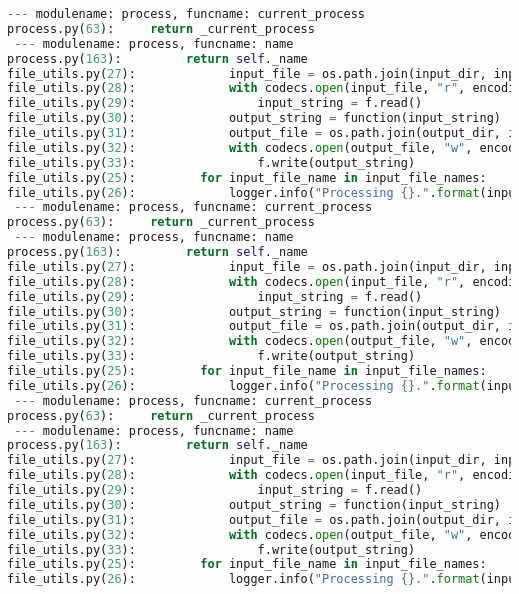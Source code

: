 \documentclass[11pt]{article}
\begin{document}
\begin{lstlisting}[language=Python]
 --- modulename: process, funcname: current_process
process.py(63):     return _current_process
 --- modulename: process, funcname: name
process.py(163):         return self._name
file_utils.py(27):             input_file = os.path.join(input_dir, input_file_name)
file_utils.py(28):             with codecs.open(input_file, "r", encoding="UTF-8") as f:
file_utils.py(29):                 input_string = f.read()
file_utils.py(30):             output_string = function(input_string)
file_utils.py(31):             output_file = os.path.join(output_dir, input_file_name)
file_utils.py(32):             with codecs.open(output_file, "w", encoding="UTF-8") as f:
file_utils.py(33):                 f.write(output_string)
file_utils.py(25):         for input_file_name in input_file_names:
file_utils.py(26):             logger.info("Processing {}.".format(input_file_name))
 --- modulename: process, funcname: current_process
process.py(63):     return _current_process
 --- modulename: process, funcname: name
process.py(163):         return self._name
file_utils.py(27):             input_file = os.path.join(input_dir, input_file_name)
file_utils.py(28):             with codecs.open(input_file, "r", encoding="UTF-8") as f:
file_utils.py(29):                 input_string = f.read()
file_utils.py(30):             output_string = function(input_string)
file_utils.py(31):             output_file = os.path.join(output_dir, input_file_name)
file_utils.py(32):             with codecs.open(output_file, "w", encoding="UTF-8") as f:
file_utils.py(33):                 f.write(output_string)
file_utils.py(25):         for input_file_name in input_file_names:
file_utils.py(26):             logger.info("Processing {}.".format(input_file_name))
 --- modulename: process, funcname: current_process
process.py(63):     return _current_process
 --- modulename: process, funcname: name
process.py(163):         return self._name
file_utils.py(27):             input_file = os.path.join(input_dir, input_file_name)
file_utils.py(28):             with codecs.open(input_file, "r", encoding="UTF-8") as f:
file_utils.py(29):                 input_string = f.read()
file_utils.py(30):             output_string = function(input_string)
file_utils.py(31):             output_file = os.path.join(output_dir, input_file_name)
file_utils.py(32):             with codecs.open(output_file, "w", encoding="UTF-8") as f:
file_utils.py(33):                 f.write(output_string)
file_utils.py(25):         for input_file_name in input_file_names:
file_utils.py(26):             logger.info("Processing {}.".format(input_file_name))

\end{lstlisting}
\end{document}
